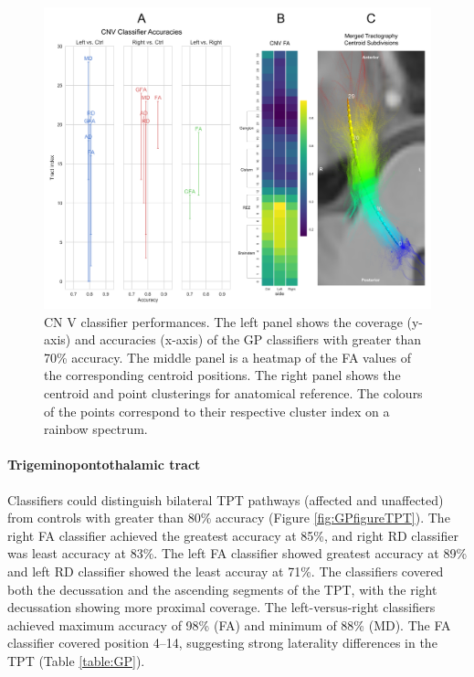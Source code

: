 \begin{figure}[ht]
\centering
\includegraphics[width=\linewidth]{figure-GP-CNV.pdf}
\caption{CN V classifier performances. The left panel shows the coverage (y-axis) and accuracies (x-axis) of the GP classifiers with greater than 70\% accuracy. The middle panel is a heatmap of the FA values of the corresponding centroid positions. The right panel shows the centroid and point clusterings for anatomical reference. The colours of the points correspond to their respective cluster index on a rainbow spectrum. }
\label{fig:GPfigure4}
\end{figure}

\paragraph{Trigeminopontothalamic tract}
Classifiers could distinguish bilateral TPT pathways (affected and unaffected) from controls with greater than 80\% accuracy (Figure \ref{fig:GPfigureTPT}). The right FA classifier achieved the greatest accuracy at 85\%, and right RD classifier was least accuracy at 83\%. The left FA classifier showed greatest accuracy at 89\% and left RD classifier showed the least accuray at 71\%. The classifiers covered both the decussation and the ascending segments of the TPT, with the right decussation showing more proximal coverage. The left-versus-right classifiers achieved maximum accuracy of 98\% (FA) and minimum of 88\% (MD). The FA classifier covered position 4--14, suggesting strong laterality differences in the TPT (Table \ref{table:GP}). 

